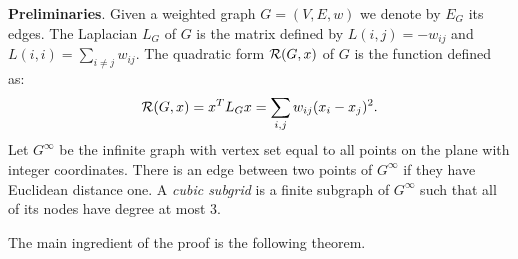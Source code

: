 \noindent \textbf{Preliminaries}. Given a weighted graph $G=(V,E,w)$ we denote by $E_G$ its edges. The Laplacian $L_G$ of $G$ is the matrix defined by $L(i,j)=-w_{ij}$ and $L(i,i) = \sum_{i\neq j} w_{ij}$. %
The quadratic form ${\cal R}(G,x)$  of $G$ is the function defined as:
\begin{equation} \label{eq:quadratic}
{\cal R}(G,x) = x^T L_G x = \sum_{i,j} w_{ij}(x_i-x_j)^2.
\end{equation}
Let $G^{\infty}$ be the infinite graph with vertex set equal to all points on the plane with integer coordinates. There is an edge between two points of $G^{\infty}$ if they have Euclidean distance one. A \textit{cubic subgrid} is a finite subgraph of $G^{\infty}$ such that all of its nodes have degree at most $3$. 


The main ingredient of the proof is the following theorem. 

